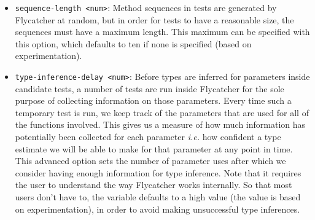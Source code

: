 \begin{itemize}
   \item \texttt{\textendash \textendash sequence-length <num>}: Method sequences in tests are generated by \textsf{Flycatcher} at random, but in order for tests to have a reasonable size, the sequences must have a maximum length. This maximum can be specified with this option, which defaults to ten if none is specified (based on experimentation).
   \item \texttt{\textendash \textendash type-inference-delay <num>}: Before types are inferred for parameters inside candidate tests, a number of tests are run inside \textsf{Flycatcher} for the sole purpose of collecting information on those parameters. Every time such a temporary test is run, we keep track of the parameters that are used for all of the functions involved. This gives us a measure of how much information has potentially been collected for each parameter \emph{i.e.} how confident a type estimate we will be able to make for that parameter at any point in time. This advanced option sets the number of parameter uses after which we consider having enough information for type inference. Note that it requires the user to understand the way \textsf{Flycatcher} works internally. So that most users don't have to, the variable defaults to a high value (the value is based on experimentation), in order to avoid making unsuccessful type inferences.
\end{itemize}



